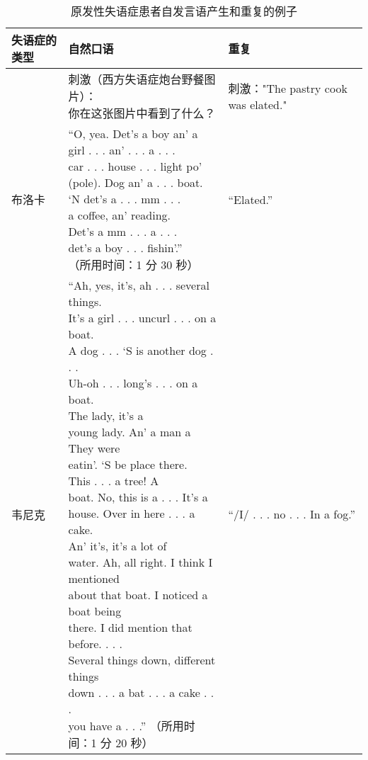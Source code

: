 \begin{table}[htbp]
	\caption{原发性失语症患者自发言语产生和重复的例子} \label{tab:55_2} \centering
	\begin{tabular}{lll}
		\toprule
		失语症的类型 & 自然口语 & 重复 \\
		\midrule
		 & \makecell[l]{刺激（西方失语症炮台野餐图片）：\\你在这张图片中看到了什么？} & 刺激："The pastry cook was elated." \\
		布洛卡 & \makecell[l]{“O, yea. Det’s a boy an’ a \\girl . . . an’ . . . a . . . \\car . . . house . . . light po’ \\ (pole). Dog an’ a . . . boat.\\ ‘N det’s a . . . mm . . . \\a coffee, an’ reading. \\ Det’s a mm . . . a . . . \\det’s a boy . . . fishin’.” \\（所用时间：1 分 30 秒）} & “Elated.” \\
		韦尼克 & \makecell[l]{“Ah, yes, it’s, ah . . . several things. \\It’s a girl . . . uncurl . . . on a boat. \\ A dog . . . ‘S is another dog . . . \\Uh-oh . . . long’s . . . on a boat. \\The lady, it’s a \\ young lady. An’ a man a They were \\eatin’. ‘S be place there. \\This . . . a tree! A \\boat. No, this is a . . . It’s a\\ house. Over in here . . . a cake. \\An’ it’s, it’s a lot of \\water. Ah, all right. I think I mentioned\\ about that boat. I noticed a boat being \\ there. I did mention that before. . . . \\Several things down, different things \\	down . . . a bat . . . a cake . . . \\you have a . . .”  （所用时间：1 分 20 秒）} & “/I/ . . . no . . . In a fog.” \\

\end{tabular}
\end{table}
